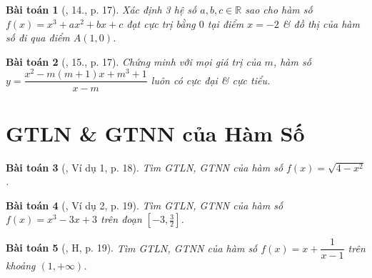 \documentclass{article}
\newtheorem{baitoan}{Bài toán}
\begin{document}
\begin{baitoan}[\cite{SGK_Toan_12_giai_tich_nang_cao}, 14., p. 17]
	Xác định 3 hệ số $a,b,c\in\mathbb{R}$ sao cho hàm số $f(x) = x^3 + ax^2 + bx + c$ đạt cực trị bằng $0$ tại điểm $x = -2$ \& đồ thị của hàm số đi qua điểm $A(1,0)$.
\end{baitoan}

\begin{baitoan}[\cite{SGK_Toan_12_giai_tich_nang_cao}, 15., p. 17]
	Chứng minh với mọi giá trị của $m$, hàm số $y = \dfrac{x^2 - m(m + 1)x + m^3 + 1}{x - m}$ luôn có cực đại \& cực tiểu.
\end{baitoan}


\section{GTLN \& GTNN của Hàm Số}

\begin{baitoan}[\cite{SGK_Toan_12_giai_tich_nang_cao}, Ví dụ 1, p. 18]
	Tìm {\rm GTLN, GTNN} của hàm số $f(x) = \sqrt{4 - x^2}$.
\end{baitoan}

\begin{baitoan}[\cite{SGK_Toan_12_giai_tich_nang_cao}, Ví dụ 2, p. 19]
	Tìm {\rm GTLN, GTNN} của hàm số $f(x) = x^3 - 3x + 3$ trên đoạn $\left[-3,\frac{3}{2}\right]$.
\end{baitoan}

\begin{baitoan}[\cite{SGK_Toan_12_giai_tich_nang_cao}, H, p. 19]
	Tìm {\rm GTLN, GTNN} của hàm số $f(x) = x + \dfrac{1}{x - 1}$ trên khoảng $(1,+\infty)$.
\end{baitoan}
\end{document}

